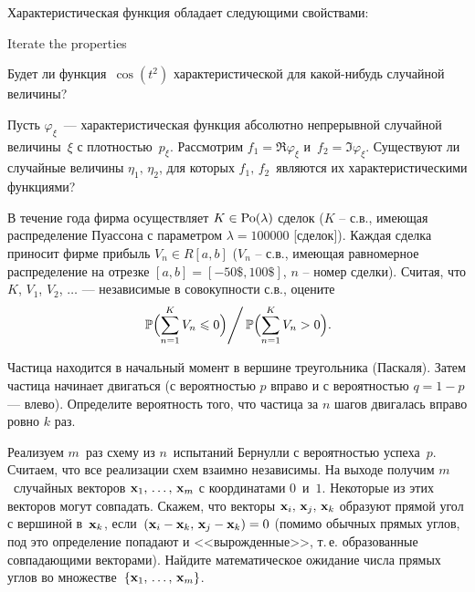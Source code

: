 \begin{ordre}
Характеристическая функция обладает следующими свойствами:
\begin{fixme}
Iterate the properties 
\end{fixme}
\end{ordre}


\begin{problem}
Будет ли функция~$\cos(t^2)$ характеристической для какой-нибудь случайной величины?
\end{problem}

\begin{problem}
Пусть $\varphi_{\xi}$~--- характеристическая функция абсолютно непрерывной случайной величины~$\xi$ с плотностью~$p_{\xi}$. Рассмотрим $f_1 = \Re \varphi_{\xi}$ и~$f_2 = \Im \varphi_{\xi} $. Существуют ли случайные величины $\eta_1,\,\eta_2$, для которых $f_1,\,f_2$~являются их характеристическими функциями? 
\end{problem}

\begin{problem}
В течение года фирма осуществляет $K\in \mathrm{Po}(\lambda)$ сделок ($K$ -- с.в., имеющая распределение Пуассона с параметром  $\lambda=100000$ 
[сделок]). Каждая сделка приносит фирме прибыль $V_n\in R[a,b]$ ($V_n$ -- с.в., имеющая равномерное распределение на отрезке 
$[a,b]=[-50\$,100\$]$, $n$ -- номер сделки). Считая, что $K$, $V_1$, $V_2$, $\ldots$ --- независимые в совокупности с.в., оцените 
\begin{equation}
\label{ProbRatio}
\left. {\mathbb P}\Bigl(\sum\limits_{n=1}^{K} V_n\leqslant 0\Bigr)\right/{\mathbb P}\Bigl(\sum\limits_{n=1}^{K} V_n>0\Bigr) . 
\end{equation}
\end{problem}


\begin{problem}
Частица находится в начальный момент в вершине треугольника (Паскаля). Затем частица начинает двигаться (с вероятностью $p$ вправо и 
с вероятностью $q = 1-p$ --- влево). Определите вероятность того, что частица за $n$ шагов 
двигалась вправо ровно $k$ раз. 
\end{problem}

\begin{problem}
Реализуем $m$~раз схему из $n$~испытаний Бернулли с вероятностью успеха~$p$. Считаем, что все реализации схем взаимно независимы. На выходе получим $m$~случайных векторов ${\bf x}_1,\,\dots,\,{\bf x}_m$ с координатами $0$~и~$1$. Некоторые из этих векторов могут совпадать. Скажем, что векторы ${\bf x}_i,\,{\bf x}_j,\,{\bf x}_k$ образуют прямой угол с вершиной в~${\bf x}_k$, если~$({\bf x}_i-{\bf x}_k,\,{\bf x}_j - {\bf x}_k) = 0$ (помимо обычных прямых углов, под это определение попадают и <<вырожденные>>, т.\,е. образованные совпадающими векторами). Найдите математическое ожидание числа прямых углов во множестве~$\{{\bf x}_1,\,\dots,\,{\bf x}_m\}$.
\end{problem}

